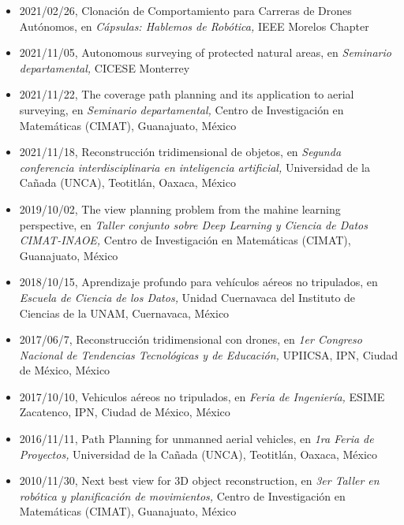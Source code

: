 \begin{itemize} 
\item 2021/02/26, Clonación de Comportamiento para Carreras de Drones Autónomos, en \textit{ Cápsulas: Hablemos de Robótica,} IEEE Morelos Chapter 
\item 2021/11/05, Autonomous surveying of protected natural areas, en \textit{ Seminario departamental,} CICESE Monterrey 
\item 2021/11/22, The coverage path planning and its application to aerial surveying, en \textit{ Seminario departamental,} Centro de Investigación en Matemáticas (CIMAT), Guanajuato, México 
\item 2021/11/18, Reconstrucción tridimensional de objetos, en \textit{ Segunda conferencia interdisciplinaria en inteligencia artificial,} Universidad de la Cañada (UNCA), Teotitlán, Oaxaca, México 
\item 2019/10/02, The view planning problem from the mahine learning perspective, en \textit{ Taller conjunto sobre Deep Learning y Ciencia de Datos CIMAT-INAOE,} Centro de Investigación en Matemáticas (CIMAT), Guanajuato, México 
\item 2018/10/15, Aprendizaje profundo para vehículos aéreos no tripulados, en \textit{ Escuela de Ciencia de los Datos,} Unidad Cuernavaca del Instituto de Ciencias de la UNAM, Cuernavaca, México 
\item 2017/06/7, Reconstrucción tridimensional con drones, en \textit{ 1er Congreso Nacional de Tendencias Tecnológicas y de Educación,} UPIICSA, IPN, Ciudad de México, México 
\item 2017/10/10, Vehiculos aéreos no tripulados, en \textit{ Feria de Ingeniería,} ESIME Zacatenco, IPN, Ciudad de México, México 
\item 2016/11/11, Path Planning for unmanned aerial vehicles, en \textit{ 1ra Feria de Proyectos,} Universidad de la Cañada (UNCA), Teotitlán, Oaxaca, México 
\item 2010/11/30, Next best view for 3D object reconstruction, en \textit{ 3er Taller en robótica y planificación de movimientos,} Centro de Investigación en Matemáticas (CIMAT), Guanajuato, México 
\end{itemize} 
